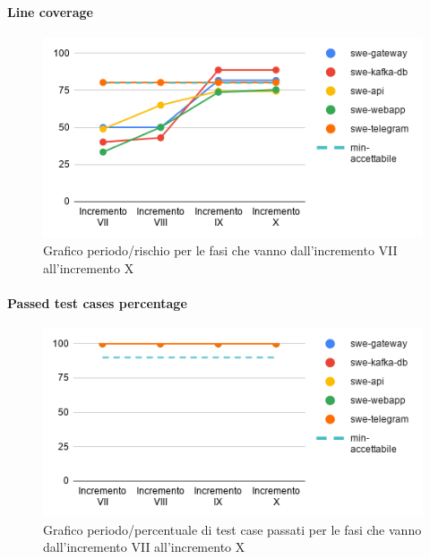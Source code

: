\paragraph{Line coverage}
\begin{figure}[H]
			\centering
			\includegraphics[width=0.8\linewidth]{./res/images/QM-TEST-3-LOCO.png}
			\caption{Grafico periodo/rischio per le fasi che vanno dall'incremento VII all'incremento X}
			\label{fig:Grafico periodo/rischio per le fasi che vanno dall'incremento VII all'incremento X}
	\end{figure}
\paragraph{Passed test cases percentage}
\begin{figure}[H]
			\centering
			\includegraphics[width=0.8\linewidth]{./res/images/QM-TEST-4-PTCP.png}
			\caption{Grafico periodo/percentuale di test case passati per le fasi che vanno dall'incremento VII all'incremento X}
			\label{fig:Grafico periodo/percentuale di test case passati per le fasi che vanno dall'incremento VII all'incremento X}
	\end{figure}
